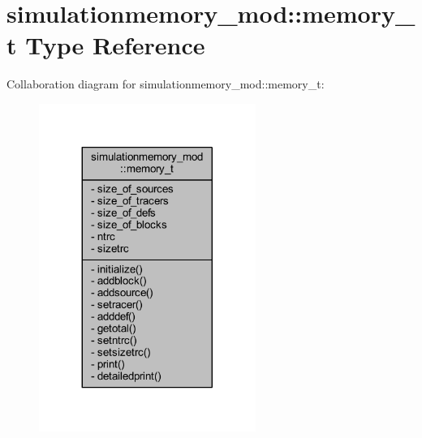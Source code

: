 \hypertarget{structsimulationmemory__mod_1_1memory__t}{}\section{simulationmemory\+\_\+mod\+:\+:memory\+\_\+t Type Reference}
\label{structsimulationmemory__mod_1_1memory__t}


Collaboration diagram for simulationmemory\+\_\+mod\+:\+:memory\+\_\+t\+:\nopagebreak
\begin{figure}[H]
\begin{center}
\leavevmode
\includegraphics[width=200pt]{structsimulationmemory__mod_1_1memory__t__coll__graph}
\end{center}
\end{figure}
